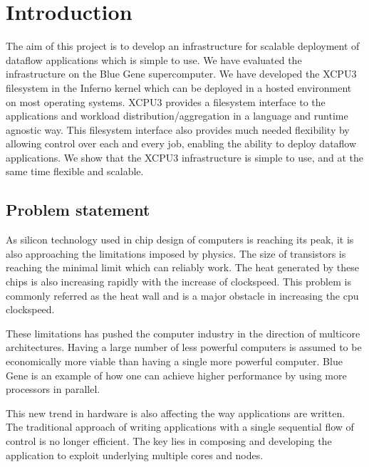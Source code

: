 
\chapter{Introduction}
\label{chap:intro}

\ifpdf
	\graphicspath{{Introduction/IntroductionFigs/PDF/}
		{Introduction/IntroductionFigs/PNG/}{Introduction/IntroductionFigs/}}
\else
	\graphicspath{{Introduction/IntroductionFigs/EPS/}
		{Introduction/IntroductionFigs/}}
\fi


The aim of this project is to develop an infrastructure for scalable deployment
of dataflow applications which is simple to use.  We have evaluated the
infrastructure on the Blue Gene supercomputer\cite{bgp}.  We have developed
the XCPU3 filesystem in the Inferno\cite{inferno} kernel which can be deployed in a hosted environment on
most operating systems.  XCPU3 provides a filesystem interface to the 
applications and workload distribution/aggregation in a language and runtime
agnostic way.  This filesystem interface also provides much needed flexibility
by allowing control over each and every job, enabling the ability to deploy
dataflow applications.  We show that the XCPU3 infrastructure is simple to use,
and at the same time flexible and scalable.

\section{Problem statement}
As silicon technology used in chip design of computers is reaching its peak,
it is also approaching the limitations imposed by physics.  The size of transistors
is reaching the minimal limit which can reliably work.  The heat generated by 
these chips is also increasing rapidly with the increase of clockspeed.  This
problem is commonly referred as the heat wall and is a major obstacle in increasing
the cpu clockspeed.

These limitations has pushed the computer industry in the direction of 
multicore architectures.  Having a large number of less powerful
computers is assumed to be economically more viable than having a single
more powerful computer.  Blue Gene is an example of how one can achieve
higher performance by using more processors in parallel.

This new trend in hardware is also affecting the way applications are
written.  The traditional approach of writing applications with a single sequential
flow of control is no longer efficient.  The key lies in composing
and developing the application to exploit underlying multiple cores and
nodes.


